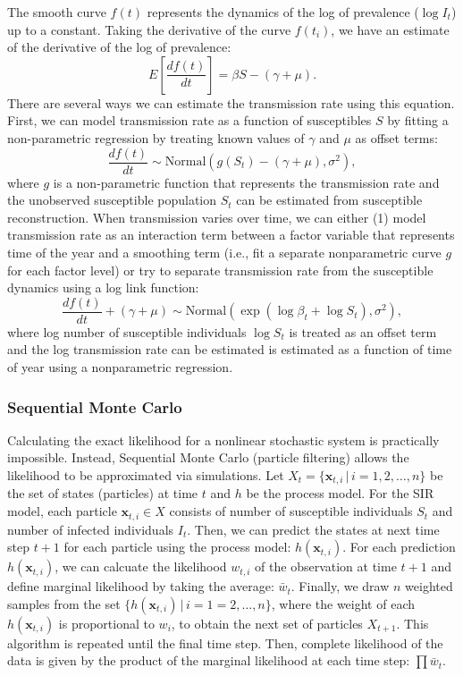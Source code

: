 \documentclass{article}
\begin{document}
The smooth curve $f(t)$ represents the dynamics of the log of prevalence ($\log I_t$) up to a constant.
Taking the derivative of the curve $f(t_i)$, we have an estimate of the derivative of the log of prevalence:
\begin{equation}
E\left[\frac{df(t)}{dt}\right] = \beta S - (\gamma + \mu).
\end{equation}
There are several ways we can estimate the transmission rate using this equation.
First, we can model transmission rate as a function of susceptibles $S$ by fitting a non-parametric regression by treating known values of $\gamma$ and $\mu$ as offset terms:
\begin{equation}
\frac{df(t)}{dt} \sim \mathrm{Normal}(g(S_t) - (\gamma + \mu), \sigma^2),
\end{equation}
where $g$ is a non-parametric function that represents the transmission rate and the unobserved susceptible population $S_t$ can be estimated from susceptible reconstruction.
When transmission varies over time, we can either (1) model transmission rate as an interaction term between a factor variable that represents time of the year and a smoothing term (i.e., fit a separate nonparametric curve $g$ for each factor level) or try to separate transmission rate from the susceptible dynamics using a log link function:
\begin{equation}
\frac{d f(t)}{dt} + (\gamma + \mu) \sim \mathrm{Normal}\left(\exp \left(\log \beta_t + \log S_t\right), \sigma^2\right),
\end{equation}
where log number of susceptible individuals $\log S_t$ is treated as an offset term and the log transmission rate can be estimated is estimated as a function of time of year using a nonparametric regression.

\subsubsection*{Sequential Monte Carlo}

Calculating the exact likelihood for a nonlinear stochastic system is practically impossible.
Instead, Sequential Monte Carlo (particle filtering) allows the likelihood to be approximated via simulations.
Let $X_t = \{\mathbf{x}_{t, i} \,|\, i= 1, 2, \dots, n\}$ be the set of states (particles) at time $t$ and $h$ be the process model.
For the SIR model, each particle $\mathbf{x}_{t, i} \in X$ consists of number of susceptible individuals $S_t$ and number of infected individuals $I_t$.
Then, we can predict the states at next time step $t+1$ for each particle using the process model: $h(\mathbf{x}_{t, i})$.
For each prediction $h(\mathbf{x}_{t, i})$, we can calcuate the likelihood $w_{t,i}$ of the observation at time $t+1$ and define marginal likelihood by taking the average: $\bar{w}_t$.
Finally, we draw $n$ weighted samples from the set $\{h(\mathbf{x}_{t, i}) \,|\, i = 1=2, \dots, n\}$, where the weight of each $h(\mathbf{x}_{t, i})$ is proportional to $w_i$, to obtain the next set of particles $X_{t+1}$.
This algorithm is repeated until the final time step.
Then, complete likelihood of the data is given by the product of the marginal likelihood at each time step: $\prod \bar{w}_{t}$.
\end{document}
